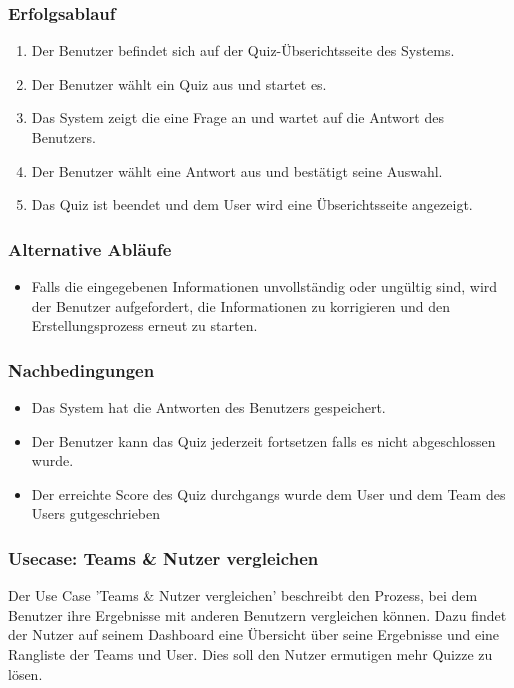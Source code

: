 \subsubsection*{Erfolgsablauf}

\begin{enumerate}
  \item Der Benutzer befindet sich auf der Quiz-Übserichtsseite des Systems.
  \item Der Benutzer wählt ein Quiz aus und startet es.
  \item Das System zeigt die eine Frage an und wartet auf die Antwort des Benutzers.
  \item Der Benutzer wählt eine Antwort aus und bestätigt seine Auswahl.
  \item Das Quiz ist beendet und dem User wird eine Übserichtsseite angezeigt.
\end{enumerate}

\subsubsection*{Alternative Abläufe}

\begin{itemize}
  \item Falls die eingegebenen Informationen unvollständig oder ungültig sind, wird der Benutzer aufgefordert, die Informationen zu korrigieren
   und den Erstellungsprozess erneut zu starten.
\end{itemize}

\subsubsection*{Nachbedingungen}

\begin{itemize}
  \item Das System hat die Antworten des Benutzers gespeichert.
  \item Der Benutzer kann das Quiz jederzeit fortsetzen falls es nicht abgeschlossen wurde.
  \item Der erreichte Score des Quiz durchgangs wurde dem User und dem Team des Users gutgeschrieben
\end{itemize}

\subsubsection{Usecase: Teams \& Nutzer vergleichen}

Der Use Case 'Teams \& Nutzer vergleichen' beschreibt den Prozess, bei dem Benutzer ihre Ergebnisse mit anderen Benutzern vergleichen können.
Dazu findet der Nutzer auf seinem Dashboard eine Übersicht über seine Ergebnisse und eine Rangliste der Teams und User. 
Dies soll den Nutzer ermutigen mehr Quizze zu lösen.

